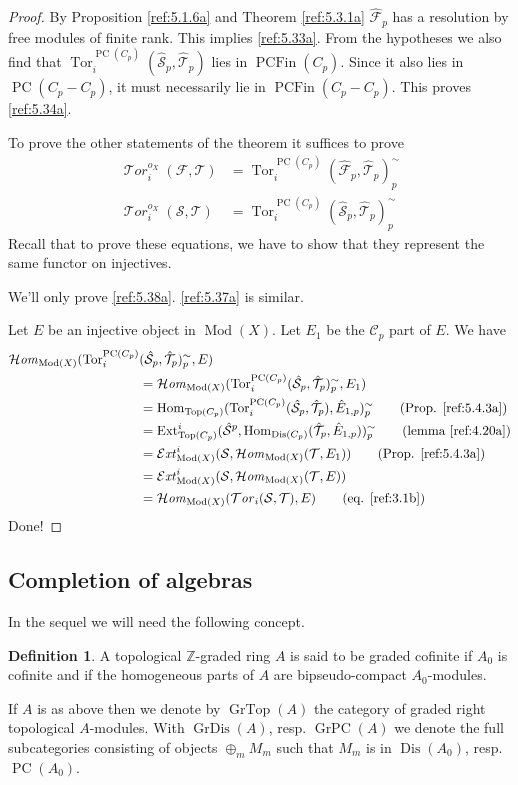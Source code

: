 \documentclass{amsproc}
\def \ZZ{{\mathbb Z}}
\def\Cscr{{\mathcal C}}
\def\Escr{{\mathcal E}}
\def\Fscr{{\mathcal F}}
\def\Hscr{{\mathcal H}}
\def\Sscr{{\mathcal S}}
\def\Tscr{{\mathcal T}}
\DeclareMathOperator{\Dis}{Dis}
\def\HHom{\operatorname {\Hscr \mathit{om}}}
\def\HExt{\operatorname {\Escr \mathit{xt}}}
\def\HTor{\operatorname {\Tscr \mathit{or}}}
\def\Ext{\operatorname {Ext}}
\def\Hom{\operatorname {Hom}}
\def\HHom{\operatorname {\Hscr \mathit{om}}}
\def\HExt{\operatorname {\Escr \mathit{xt}}}
\def\HTor{\operatorname {\Tscr \mathit{or}}}
\def\Tor{\operatorname {Tor}}
\def\Qch{\operatorname {Mod}}
\let\oldtext\text
\def\text#1{\oldtext{\upshape #1}}
\DeclareMathOperator{\PC}{PC}
\DeclareMathOperator{\GrPC}{GrPC}
\DeclareMathOperator{\GrDis}{GrDis}
\DeclareMathOperator{\Top}{Top}
\DeclareMathOperator{\GrTop}{GrTop}
\DeclareMathOperator{\PCFin}{PCFin}
\theoremstyle{definition}
\newtheorem{definitions}[lemmas]{Definition}
\theoremstyle{remark}
\numberwithin{equation}{section}
\numberwithin{table}{section}
\numberwithin{figure}{section}
\begin{document}
\begin{proof}
  By Proposition \ref{ref:5.1.6a} and Theorem \ref{ref:5.3.1a}
  $\hat{\Fscr}_p$ has   a resolution by free modules of finite rank. This implies
  \eqref{ref:5.33a}. From the hypotheses we also find that
  $\Tor^{\PC(C_p)}_i(\hat{\Sscr}_p,\hat{\Tscr}_p)$ lies in
  $\PCFin(C_p)$.  Since it also lies in $\PC(C_p-C_p)$, it must
  necessarily lie in $\PCFin(C_p-C_p)$. This proves \eqref{ref:5.34a}.

To prove the other statements of the theorem it suffices to prove 
\begin{align}
\label{ref:5.37a}
\HTor_i^{o_X}(\Fscr,\Tscr)
&=\Tor^{\PC(C_p)}_i(\hat{\Fscr}_p,\hat{\Tscr}_p)^\sim_p\\
\label{ref:5.38a}
\HTor_i^{o_X}(\Sscr,\Tscr)
&=\Tor^{\PC(C_p)}_i(\hat{\Sscr}_p,\hat{\Tscr}_p)^\sim_p
\end{align}
Recall that to prove these equations, we have to show that they represent
the same functor on injectives.

We'll only prove \eqref{ref:5.38a}. \eqref{ref:5.37a} is similar.

Let $E$ be an injective object in $\Qch(X)$. Let $E_1$ be the $\Cscr_p$
part of $E$. We have 
\begin{align*}
\HHom_{\Qch(X)}(\Tor^{\PC(C_p)}_i&
(\hat{\Sscr}_p,\hat{\Tscr}_p)^\sim_p,E)\\
&=\HHom_{\Qch(X)}(\Tor^{\PC(C_p)}_i(\hat{\Sscr}_p,
\hat{\Tscr}_p)^\sim_p,E_1)
\\
&=\Hom_{\Top(C_p)}
(\Tor^{\PC(C_p)}_i(\hat{\Sscr}_p,\hat{\Tscr}_p),\hat{E}_{1,p})^\sim_p
\qquad\text{(Prop. \ref{ref:5.4.3a})}
\\
&=\Ext^i_{\Top(C_p)}(\hat{\Sscr}^p,\Hom_{\Dis(C_p)}(\hat{\Tscr}_p
,\hat{E}_{1,p}))^\sim_p\qquad \text{(lemma \ref{ref:4.20a})}\\
&=\HExt^i_{\Qch(X)}(\Sscr,\HHom_{\Qch(X)}(\Tscr,E_1))\qquad
\text{(Prop. \ref{ref:5.4.3a})}\\
&=\HExt^i_{\Qch(X)}(\Sscr,\HHom_{\Qch(X)}(\Tscr,E))\\
&=\HHom_{\Qch(X)}(\HTor_i(\Sscr,\Tscr),E)\qquad 
\text{(eq. \eqref{ref:3.1b})}
\end{align*}
Done!
\end{proof}


\subsection{Completion of algebras}
In the sequel we will need the following concept.
\begin{definitions} 
\label{ref:5.6.1a}
A topological $\ZZ$-graded ring $A$ is said to be graded cofinite
if $A_0$ is cofinite and if the homogeneous parts of $A$ are
bipseudo-compact $A_0$-modules.
\end{definitions}
If $A$ is as above then we denote by $\GrTop(A)$ the category of
graded right topological $A$-modules. With $\GrDis(A)$, resp.
$\GrPC(A)$ we denote the full subcategories consisting of objects
$\oplus_m M_m$ such that $M_m$ is in $\Dis(A_0)$, resp. $\PC(A_0)$.
\end{document}
